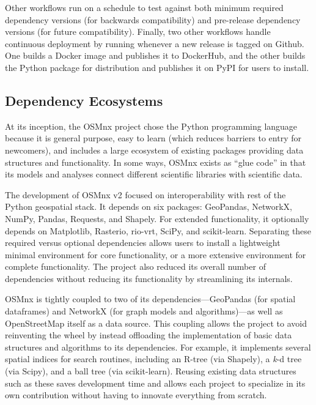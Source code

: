 \documentclass[12pt,letterpaper]{article} %
\begin{document}
Other workflows run on a schedule to test against both minimum required dependency versions (for backwards compatibility) and pre-release dependency versions (for future compatibility). Finally, two other workflows handle continuous deployment by running whenever a new release is tagged on Github. One builds a Docker image and publishes it to DockerHub, and the other builds the Python package for distribution and publishes it on PyPI for users to install.

\subsection{Dependency Ecosystems}

At its inception, the OSMnx project chose the Python programming language because it is general purpose, easy to learn (which reduces barriers to entry for newcomers), and includes a large ecosystem of existing packages providing data structures and functionality. In some ways, OSMnx exists as \enquote{glue code} in that its models and analyses connect different scientific libraries with scientific data.

The development of OSMnx v2 focused on interoperability with rest of the Python geospatial stack. It depends on six packages: GeoPandas, NetworkX, NumPy, Pandas, Requests, and Shapely. For extended functionality, it optionally depends on Matplotlib, Rasterio, rio-vrt, SciPy, and scikit-learn. Separating these required versus optional dependencies allows users to install a lightweight minimal environment for core functionality, or a more extensive environment for complete functionality. The project also reduced its overall number of dependencies without reducing its functionality by streamlining its internals.

OSMnx is tightly coupled to two of its dependencies---GeoPandas (for spatial dataframes) and NetworkX (for graph models and algorithms)---as well as OpenStreetMap itself as a data source. This coupling allows the project to avoid reinventing the wheel by instead offloading the implementation of basic data structures and algorithms to its dependencies. For example, it implements several spatial indices for search routines, including an R-tree (via Shapely), a \textit{k}-d tree (via Scipy), and a ball tree (via scikit-learn). Reusing existing data structures such as these saves development time and allows each project to specialize in its own contribution without having to innovate everything from scratch.
\end{document}
